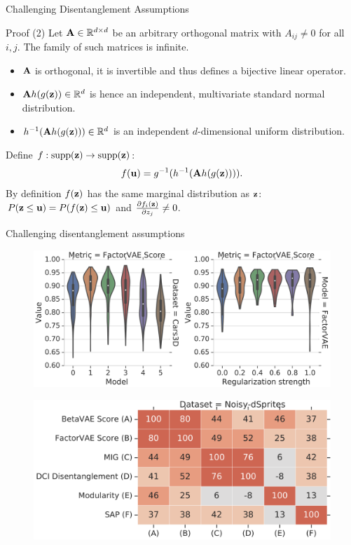 \documentclass{beamer}
\begin{document}
\begin{frame}{Challenging Disentanglement Assumptions}
\begin{block}{Proof (2)}
	Let $\mathbf{A} \in \mathbb{R}^{d \times d}$ be an arbitrary orthogonal matrix with $A_{ij} \neq 0$ for all $i, j$.
	The family of such matrices is infinite.
	\begin{itemize}
		\item $\mathbf{A}$ is orthogonal, it is invertible and thus defines a bijective linear operator. 
		\item $\mathbf{A} h(g(\mathbf{z})) \in \mathbb{R}^d$ is hence an independent, multivariate standard normal distribution.
		\item $h^{-1}( \mathbf{A} h(g(\mathbf{z}))) \in \mathbb{R}^d$ is an independent $d$-dimensional uniform distribution.
	\end{itemize}
	Define $f: \text{supp}(\mathbf{z}) \rightarrow \text{supp}(\mathbf{z})$:
	\vspace{-0.2cm}
	\[
	f(\mathbf{u}) = g^{-1} (h^{-1}( \mathbf{A} h(g(\mathbf{z})))).
	\]
	By definition $f(\mathbf{z})$ has the same marginal distribution as $\mathbf{z}$: $P(\mathbf{z} \leq \mathbf{u}) = P(f(\mathbf{z}) \leq \mathbf{u})$ and $\frac{\partial f_i(\mathbf{z})}{\partial z_j} \neq 0$.
\end{block}

\end{frame}
\begin{frame}{Challenging disentanglement assumptions}
	\begin{figure}
		\centering
		\includegraphics[width=0.85\linewidth]{figs/challenge_dis_2}
	\end{figure}
	\vspace{-0.3cm}
	\begin{figure}
		\centering
		\includegraphics[width=0.65\linewidth]{figs/challenge_dis_3}
	\end{figure}

\end{frame}
\end{document}
